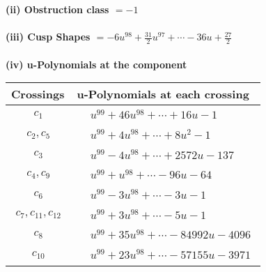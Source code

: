 \documentclass[1p]{elsarticle_modified}
\theoremstyle{definition}
\begin{document}
\flushleft \textbf{(ii) Obstruction class $= -1$}\\~\\
\flushleft \textbf{(iii) Cusp Shapes $= -6 u^{98}+\frac{31}{2} u^{97}+\cdots-36 u+\frac{27}{2}$}\\~\\
\newpage\renewcommand{\arraystretch}{1}
\flushleft \textbf{(iv) u-Polynomials at the component}\newline \\
\begin{tabular}{m{50pt}|m{274pt}}
Crossings & \hspace{64pt}u-Polynomials at each crossing \\
\hline $$\begin{aligned}c_{1}\end{aligned}$$&$\begin{aligned}
&u^{99}+46 u^{98}+\cdots+16 u-1
\end{aligned}$\\
\hline $$\begin{aligned}c_{2},c_{5}\end{aligned}$$&$\begin{aligned}
&u^{99}+4 u^{98}+\cdots+8 u^2-1
\end{aligned}$\\
\hline $$\begin{aligned}c_{3}\end{aligned}$$&$\begin{aligned}
&u^{99}-4 u^{98}+\cdots+2572 u-137
\end{aligned}$\\
\hline $$\begin{aligned}c_{4},c_{9}\end{aligned}$$&$\begin{aligned}
&u^{99}+u^{98}+\cdots-96 u-64
\end{aligned}$\\
\hline $$\begin{aligned}c_{6}\end{aligned}$$&$\begin{aligned}
&u^{99}-3 u^{98}+\cdots-3 u-1
\end{aligned}$\\
\hline $$\begin{aligned}c_{7},c_{11},c_{12}\end{aligned}$$&$\begin{aligned}
&u^{99}+3 u^{98}+\cdots-5 u-1
\end{aligned}$\\
\hline $$\begin{aligned}c_{8}\end{aligned}$$&$\begin{aligned}
&u^{99}+35 u^{98}+\cdots-84992 u-4096
\end{aligned}$\\
\hline $$\begin{aligned}c_{10}\end{aligned}$$&$\begin{aligned}
&u^{99}+23 u^{98}+\cdots-57155 u-3971
\end{aligned}$\\
\hline
\end{tabular}\\~\\
\end{document}
